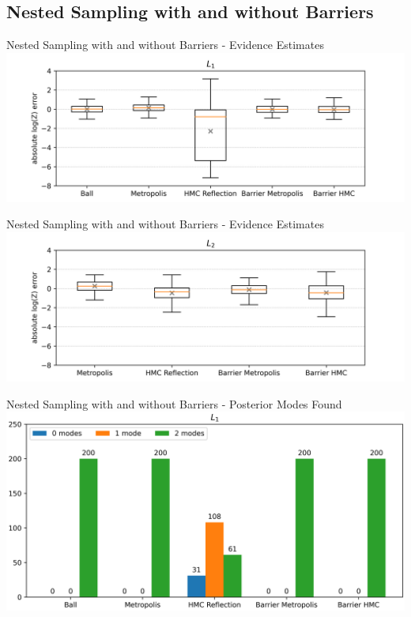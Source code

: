 \documentclass[]{beamer}
\begin{document}
  \subsection*{Nested Sampling with and without Barriers}
  \begin{frame}{Nested Sampling with and without Barriers - Evidence Estimates}
    \centering
    \includegraphics[trim={2cm, 0cm, 1.8cm, 0cm}, clip, scale=0.6]{figs/results/logZ_diffs_spike_20d.png}
  \end{frame}
  \begin{frame}{Nested Sampling with and without Barriers - Evidence Estimates}
    \centering
    \includegraphics[trim={2cm, 0cm, 1.8cm, 0cm}, clip, scale=0.6]{figs/results/logZ_diffs_spike_offcenter_20d.png}
  \end{frame}
  \begin{frame}{Nested Sampling with and without Barriers - Posterior Modes Found}
    \centering
    \includegraphics[scale=0.52]{figs/results/modes_found_spike_20d.png}
  \end{frame}
\end{document}
